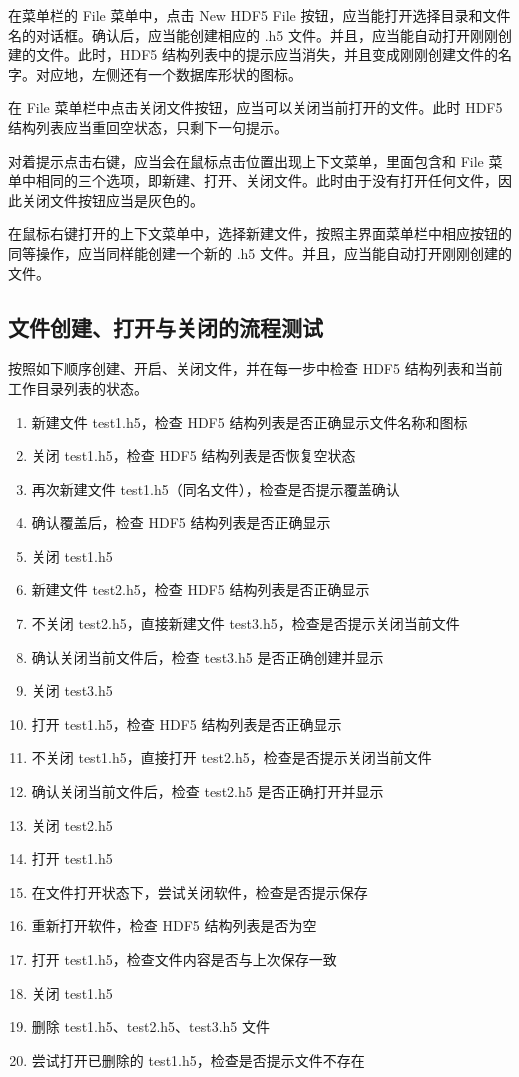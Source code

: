 \documentclass[a4paper,12pt]{report}	%
\begin{document}
在菜单栏的 File 菜单中，点击 New HDF5 File 按钮，应当能打开选择目录和文件名的对话框。确认后，应当能创建相应的 .h5 文件。并且，应当能自动打开刚刚创建的文件。此时，HDF5 结构列表中的提示应当消失，并且变成刚刚创建文件的名字。对应地，左侧还有一个数据库形状的图标。

在 File 菜单栏中点击关闭文件按钮，应当可以关闭当前打开的文件。此时 HDF5 结构列表应当重回空状态，只剩下一句提示。

对着提示点击右键，应当会在鼠标点击位置出现上下文菜单，里面包含和 File 菜单中相同的三个选项，即新建、打开、关闭文件。此时由于没有打开任何文件，因此关闭文件按钮应当是灰色的。

在鼠标右键打开的上下文菜单中，选择新建文件，按照主界面菜单栏中相应按钮的同等操作，应当同样能创建一个新的 .h5 文件。并且，应当能自动打开刚刚创建的文件。

\subsection{文件创建、打开与关闭的流程测试}
按照如下顺序创建、开启、关闭文件，并在每一步中检查 HDF5 结构列表和当前工作目录列表的状态。

\begin{enumerate}
    \item 新建文件 test1.h5，检查 HDF5 结构列表是否正确显示文件名称和图标
    \item 关闭 test1.h5，检查 HDF5 结构列表是否恢复空状态
    \item 再次新建文件 test1.h5（同名文件），检查是否提示覆盖确认
    \item 确认覆盖后，检查 HDF5 结构列表是否正确显示
    \item 关闭 test1.h5
    \item 新建文件 test2.h5，检查 HDF5 结构列表是否正确显示
    \item 不关闭 test2.h5，直接新建文件 test3.h5，检查是否提示关闭当前文件
    \item 确认关闭当前文件后，检查 test3.h5 是否正确创建并显示
    \item 关闭 test3.h5
    \item 打开 test1.h5，检查 HDF5 结构列表是否正确显示
    \item 不关闭 test1.h5，直接打开 test2.h5，检查是否提示关闭当前文件
    \item 确认关闭当前文件后，检查 test2.h5 是否正确打开并显示
    \item 关闭 test2.h5
    \item 打开 test1.h5
    \item 在文件打开状态下，尝试关闭软件，检查是否提示保存
    \item 重新打开软件，检查 HDF5 结构列表是否为空
    \item 打开 test1.h5，检查文件内容是否与上次保存一致
    \item 关闭 test1.h5
    \item 删除 test1.h5、test2.h5、test3.h5 文件
    \item 尝试打开已删除的 test1.h5，检查是否提示文件不存在
\end{enumerate}
\end{document}
